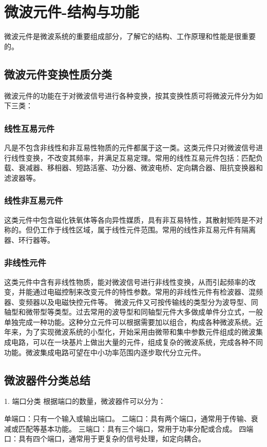 \section{微波元件-结构与功能}
微波元件是微波系统的重要组成部分，了解它的结构、工作原理和性能是很重要的。

\subsection{微波元件变换性质分类}
微波元件的功能在于对微波信号进行各种变换，按其变换性质可将微波元件分为如下三类：

\subsubsection{线性互易元件}
凡是不包含非线性和非互易性物质的元件都属于这一类。这类元件只对微波信号进行线性变换，不改变其频率，并满足互易定理。常用的线性互易元件包括：匹配负载、衰减器、移相器、短路活塞、功分器、微波电桥、定向耦合器、阻抗变换器和滤波器等。

\subsubsection{线性非互易元件}
这类元件中包含磁化铁氧体等各向异性媒质，具有非互易特性，其散射矩阵是不对称的。但仍工作于线性区域，属于线性元件范围。常用的线性非互易元件有隔离器、环行器等。

\subsubsection{非线性元件}
这类元件中含有非线性物质，能对微波信号进行非线性变换，从而引起频率的改变，并能通过电磁控制来改变元件的特性参数。常用的非线性元件有检波器、混频器、变频器以及电磁快控元件等。
微波元件又可按传输线的类型分为波导型、同轴型和微带型等类型。过去常用的波导型和同轴型元件大多做成单件分立式，一般单独完成一种功能。这种分立元件可以根据需要加以组合，构成各种微波系统。近年来，为了实现微波系统的小型化，开始采用由微带和集中参数元件组成的微波集成电路，可以在一块基片上做出大量的元件，组成复杂的微波系统，完成各种不同功能。微波集成电路可望在中小功率范围内逐步取代分立元件。

\subsection{微波器件分类总结}
1. 端口分类
根据端口的数量，微波器件可以分为：

单端口：只有一个输入或输出端口。
二端口：具有两个端口，通常用于传输、衰减或匹配等基本功能。
三端口：具有三个端口，常用于功率分配或合成。
四端口：具有四个端口，通常用于更复杂的信号处理，如定向耦合。

